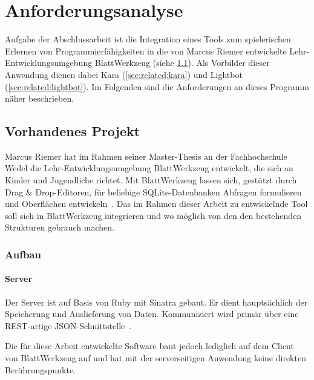 \chapter{Anforderungsanalyse}
\label{sec:requirements}

Aufgabe der Abschlussarbeit ist die Integration eines Tools zum spielerischen Erlernen von Programmierfähigkeiten in die von Marcus Riemer entwickelte Lehr-Entwicklungsumgebung BlattWerkzeug (siehe \ref{sec:requirements:existing}). Als Vorbilder dieser Anwendung dienen dabei Kara (\ref{sec:related:kara}) und Lightbot (\ref{sec:related:lightbot}). Im Folgenden sind die Anforderungen an dieses Programm näher beschrieben.

\section{Vorhandenes Projekt}
\label{sec:requirements:existing}

Marcus Riemer hat im Rahmen seiner Master-Thesis an der Fachhochschule Wedel die Lehr-Entwicklungsumgebung BlattWerkzeug entwickelt, die sich an Kinder und Jugendliche richtet. Mit BlattWerkzeug lassen sich, gestützt durch Drag \& Drop-Editoren, für beliebige SQLite-Datenbanken Abfragen formulieren und Oberflächen entwickeln~\cite[2]{riemer2016}. Das im Rahmen dieser Arbeit zu entwickelnde Tool soll sich in BlattWerkzeug integrieren und wo möglich von den den bestehenden Strukturen gebrauch machen.

\subsection{Aufbau}

\subsubsection{Server}

Der Server ist auf Basis von Ruby mit Sinatra gebaut. Er dient hauptsächlich der Speicherung und Auslieferung von Daten. Kommuniziert wird primär über eine REST-artige JSON-Schnittstelle~\cite[94]{riemer2016}.

Die für diese Arbeit entwickelte Software baut jedoch lediglich auf dem Client von BlattWerkzeug auf und hat mit der serverseitigen Anwendung keine direkten Berührungspunkte.

